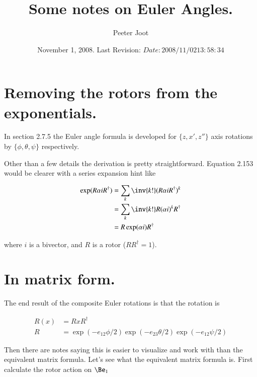 \documentclass{article}      %
\title{Some notes on Euler Angles.} %
\author{Peeter Joot}         %
\date{ November 1, 2008. Last Revision: $Date: 2008/11/02 13:58:34 $ } %
\begin{document}

\maketitle{}
\tableofcontents

\section{ Removing the rotors from the exponentials. }

In \cite{doran2003gap} section 2.7.5 the Euler angle formula is 
developed for $\{z,x',z''\}$ axis rotations by $\{\phi, \theta, \psi\}$
respectively.

Other than a few details the derivation is pretty straightforward.  Equation
2.153 would be clearer with a series expansion hint like

\begin{align*}
\exp(R \alpha i R^\dagger) 
&= \sum_k \inv{k!} (R \alpha i R^\dagger)^k \\
&= \sum_k \inv{k!} R (\alpha i)^k R^\dagger \\
&= R \exp(\alpha i) R^\dagger
\end{align*}

where $i$ is a bivector, and $R$ is a rotor ($RR^\dagger = 1$).

\section{ In matrix form. }

The end result of the composite Euler rotations is that the rotation is

\begin{align*}
R(x) &= R x R^\dagger \\
R &= \exp(-e_{12}\phi/2) \exp(-e_{23}\theta/2) \exp(-e_{12}\psi/2)
\end{align*}

Then there are notes saying this is easier to visualize and work with than
the equivalent matrix formula.  Let's see what the equivalent matrix formula
is.  First calculate the rotor action on $\Be_1$
\end{document}
